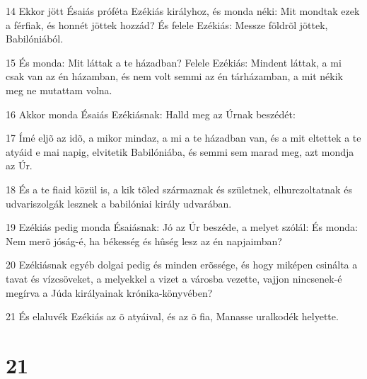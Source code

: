 \par 14 Ekkor jött Ésaiás próféta Ezékiás királyhoz, és monda néki: Mit mondtak ezek a férfiak, és honnét jöttek hozzád? És felele Ezékiás: Messze földrõl jöttek, Babilóniából.
\par 15 És monda: Mit láttak a te házadban? Felele Ezékiás: Mindent láttak, a mi csak van az én házamban, és nem volt semmi az én tárházamban, a mit nékik meg ne mutattam volna.
\par 16 Akkor monda Ésaiás Ezékiásnak: Halld meg az Úrnak beszédét:
\par 17 Ímé eljõ az idõ, a mikor mindaz, a mi a te házadban van, és a mit eltettek a te atyáid e mai napig, elvitetik Babilóniába, és semmi sem marad meg, azt mondja az Úr.
\par 18 És a te fiaid közül is, a kik tõled származnak és születnek, elhurczoltatnak és udvariszolgák lesznek a babilóniai király udvarában.
\par 19 Ezékiás pedig monda Ésaiásnak: Jó az Úr beszéde, a melyet szólál: És monda: Nem merõ jóság-é, ha békesség és hûség lesz az én napjaimban?
\par 20 Ezékiásnak egyéb dolgai pedig és minden erõssége, és hogy miképen csinálta a tavat és vízcsöveket, a melyekkel a vizet a városba vezette, vajjon nincsenek-é megírva a Júda királyainak krónika-könyvében?
\par 21 És elaluvék Ezékiás az õ atyáival, és az õ fia, Manasse uralkodék helyette.

\chapter{21}

